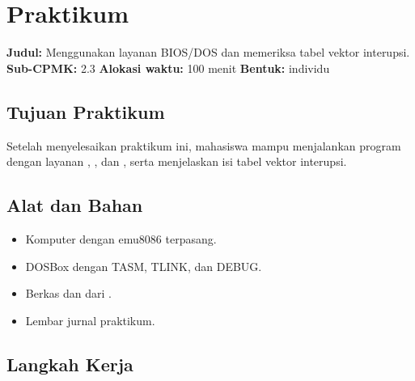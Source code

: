 \section{Praktikum}
\label{sec:praktikum-bab9}

\begin{praktikumbox}
\vspace{1.1em}
\textbf{Judul:} Menggunakan layanan BIOS/DOS dan memeriksa tabel
vektor interupsi.\\[0.3em]
\textbf{Sub-CPMK:} 2.3 \quad\textbullet\quad
\textbf{Alokasi waktu:} 100 menit \quad\textbullet\quad
\textbf{Bentuk:} individu
\end{praktikumbox}

\subsection{Tujuan Praktikum}

Setelah menyelesaikan praktikum ini, mahasiswa mampu menjalankan
program dengan layanan , , dan
, serta menjelaskan isi tabel vektor interupsi.

\subsection{Alat dan Bahan}

\begin{itemize}
    \item Komputer dengan emu8086 terpasang.
    \item DOSBox dengan TASM, TLINK, dan DEBUG.
    \item Berkas  dan 
          dari .
    \item Lembar jurnal praktikum.
\end{itemize}

\subsection{Langkah Kerja}

